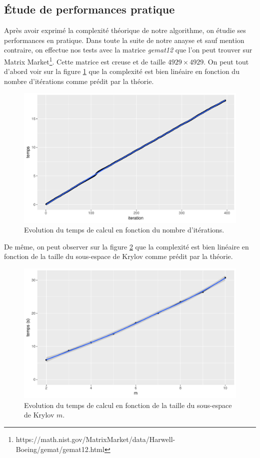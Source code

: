 \documentclass[11pt,a4paper]{article}
\begin{document}
	\subsection{Étude de performances pratique}
		Après avoir exprimé la complexité théorique de notre algorithme, on étudie ses performances en pratique. Dans toute la suite de notre anayse et sauf mention contraire, on effectue nos tests avec la matrice \textit{gemat12} que l'on peut trouver sur Matrix Market\footnote{https://math.nist.gov/MatrixMarket/data/Harwell-Boeing/gemat/gemat12.html}. Cette matrice est creuse et de taille $4929\times 4929$. On peut tout d'abord voir sur la figure \ref{fig:tvsiter} que la complexité est bien linéaire en fonction du nombre d'itérations comme prédit par la théorie.
		\begin{figure}
			\centering
			\includegraphics[width = 0.7\linewidth]{plots/tvsiter.pdf}
			\caption{Evolution du temps de calcul en fonction du nombre d'itérations. \label{fig:tvsiter}}
		\end{figure}

		De même, on peut observer sur la figure \ref{fig:tvsm} que la complexité est bien linéaire en fonction de la taille du sous-espace de Krylov comme prédit par la théorie.
		\begin{figure}
			\centering
			\includegraphics[width = 0.7\linewidth]{plots/tvsm.pdf}
			\caption{Evolution du temps de calcul en fonction de la taille du sous-espace de Krylov $m$. \label{fig:tvsm}}
		\end{figure}
\end{document}
